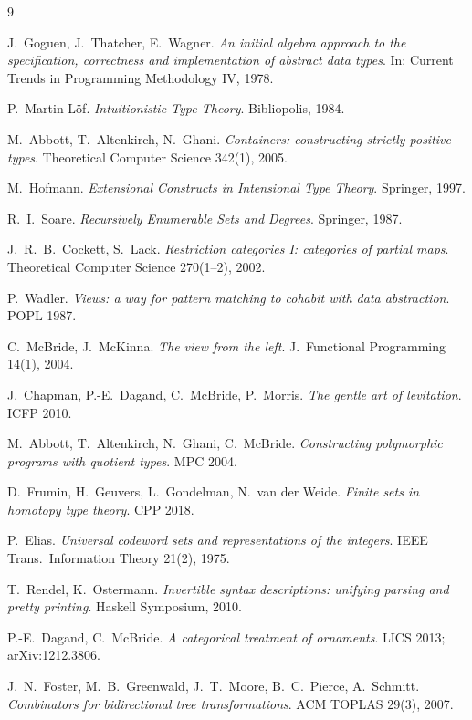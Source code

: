 \documentclass[11pt]{article}
\theoremstyle{definition}
\begin{document}
\begin{thebibliography}{9}\small\raggedright

 J.~Goguen, J.~Thatcher, E.~Wagner.
\emph{An initial algebra approach to the specification, correctness and
implementation of abstract data types}. In: Current Trends in Programming
Methodology IV, 1978.

 P.~Martin-L\"of.
\emph{Intuitionistic Type Theory}. Bibliopolis, 1984.

 M.~Abbott, T.~Altenkirch, N.~Ghani.
\emph{Containers: constructing strictly positive types}.
Theoretical Computer Science 342(1), 2005.

 M.~Hofmann.
\emph{Extensional Constructs in Intensional Type Theory}. Springer, 1997.

 R.~I.~Soare.
\emph{Recursively Enumerable Sets and Degrees}. Springer, 1987.

 J.~R.~B.~Cockett, S.~Lack.
\emph{Restriction categories I: categories of partial maps}.
Theoretical Computer Science 270(1--2), 2002.

 P.~Wadler.
\emph{Views: a way for pattern matching to cohabit with data abstraction}.
POPL 1987.

 C.~McBride, J.~McKinna.
\emph{The view from the left}. J.\ Functional Programming 14(1), 2004.

 J.~Chapman, P.-E.~Dagand, C.~McBride, P.~Morris.
\emph{The gentle art of levitation}. ICFP 2010.

 M.~Abbott, T.~Altenkirch, N.~Ghani, C.~McBride.
\emph{Constructing polymorphic programs with quotient types}. MPC 2004.

 D.~Frumin, H.~Geuvers, L.~Gondelman, N.~van der Weide.
\emph{Finite sets in homotopy type theory}. CPP 2018.

 P.~Elias.
\emph{Universal codeword sets and representations of the integers}.
IEEE Trans.\ Information Theory 21(2), 1975.

 T.~Rendel, K.~Ostermann.
\emph{Invertible syntax descriptions: unifying parsing and pretty printing}.
Haskell Symposium, 2010.

 P.-E.~Dagand, C.~McBride.
\emph{A categorical treatment of ornaments}. LICS 2013; arXiv:1212.3806.

 J.~N.~Foster, M.~B.~Greenwald, J.~T.~Moore, B.~C.~Pierce,
A.~Schmitt. \emph{Combinators for bidirectional tree transformations}.
ACM TOPLAS 29(3), 2007.


\end{thebibliography}
\end{document}
